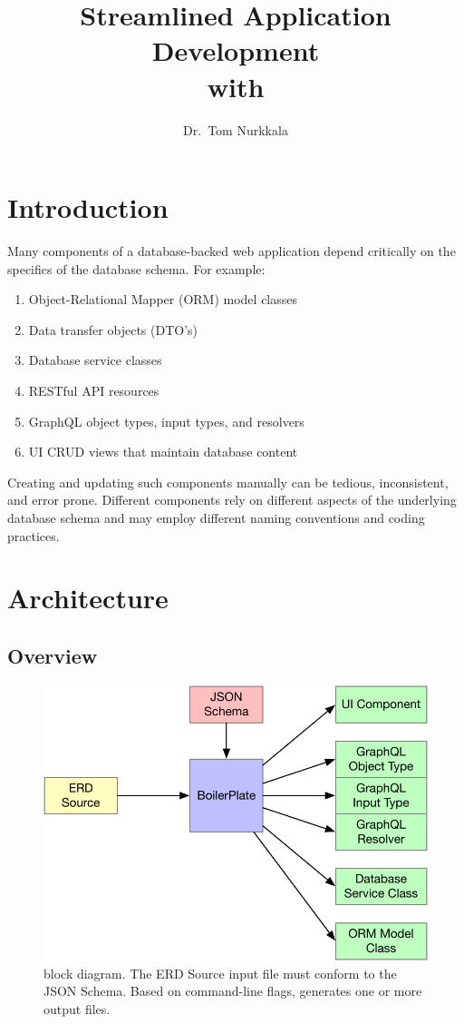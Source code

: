 \documentclass{article}
\title{Streamlined Application Development\\with \boil}
\author{Dr.\ Tom Nurkkala}
\begin{document}
\maketitle
\tableofcontents

\section{Introduction}
\label{sec:introduction}

Many components of a database-backed web application
depend critically
on the specifics of the database schema.
For example:
\begin{enumerate}
\item Object-Relational Mapper (ORM) model classes
\item Data transfer objects (DTO's)
\item Database service classes
\item RESTful API resources
\item GraphQL object types, input types, and resolvers
\item UI CRUD views that maintain database content
\end{enumerate}
Creating
and updating
such components manually
can be tedious, inconsistent, and error prone.
Different components
rely on different aspects
of the underlying database schema
and may employ different naming conventions and
coding practices.


\section{Architecture}
\label{sec:architecture}

\subsection{Overview}
\label{sec:overview}

\begin{figure}
  \centering
  \includegraphics[width=\textwidth]{block-diagram}
  \caption{
    \boil{} block diagram.
    The \textsf{ERD Source} input file
    must conform to the \textsf{JSON Schema}.
    Based on command-line flags,
    \boil{} generates one or more output files.
  }
  \label{fig:block-diagram}
\end{figure}
\end{document}
